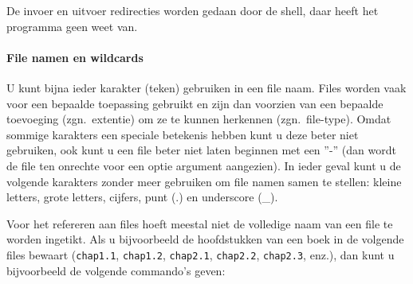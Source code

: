 De invoer en uitvoer redirecties worden gedaan door de shell,
daar heeft het programma geen weet van.
\paragraph{File namen en wildcards}
\label{File namen en wildcards}
U kunt bijna ieder karakter (teken) gebruiken in een file naam.
Files worden vaak voor een bepaalde toepassing gebruikt
en zijn dan voorzien van een bepaalde toevoeging (zgn.\ extentie)
om ze te kunnen herkennen (zgn.\ file-type).
Omdat sommige karakters een speciale betekenis hebben
kunt u deze beter niet gebruiken, ook kunt u een file beter
niet laten beginnen met een ''-'' (dan wordt de file ten onrechte
voor een optie argument aangezien).
In ieder geval kunt u de volgende karakters zonder meer
gebruiken om file namen samen te stellen: kleine letters,
grote letters, cijfers, punt (.) en underscore (\_).

Voor het refereren aan files hoeft meestal niet de volledige naam
van een file te worden ingetikt. 
Als u bijvoorbeeld de hoofdstukken van een boek in de volgende
files bewaart ({\tt chap1.1},
{\tt chap1.2}, {\tt chap2.1}, {\tt chap2.2}, {\tt chap2.3}, enz.),
dan kunt u bijvoorbeeld de volgende commando's geven:


